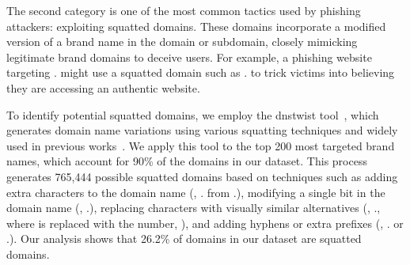 The second category is one of the most common tactics used by phishing attackers: exploiting squatted domains. These domains incorporate a modified version of a brand name in the domain or subdomain, closely mimicking legitimate brand domains to deceive users. For example, a phishing website targeting . might use a squatted domain such as . to trick victims into believing they are accessing an authentic website.

To identify potential squatted domains, we employ the dnstwist tool~\cite{elceefdn84:online}, which generates domain name variations using various squatting techniques and widely used in previous works~\cite{CompareP38:online,sharma2024securing,gorboe2022detection,kaushik2021exploring}. 
We apply this tool to the top 200 most targeted brand names, which account for 90\% of the domains in our dataset. 
This process generates 765,444 possible squatted domains based on techniques such as adding extra characters to the domain name (\eg, . from .), modifying a single bit in the domain name (\eg, .), replacing characters with visually similar alternatives (\eg, ., where  is replaced with the number, ), and adding hyphens or extra prefixes (\eg, . or .).
Our analysis shows that 26.2\% of domains in our dataset are squatted domains.





